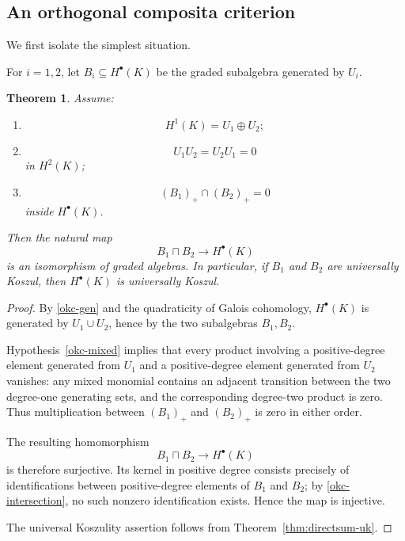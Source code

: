 \documentclass[12pt]{amsart}
\theoremstyle{plain}
\newtheorem{theorem}{Theorem}[section]
\theoremstyle{definition}
\theoremstyle{remark}
\numberwithin{equation}{section}
\begin{document}
\subsection{An orthogonal composita criterion}

We first isolate the simplest situation.

For \(i=1,2\), let \(B_i\subseteq H^\bullet(K)\) be the graded
subalgebra generated by \(U_i\).

\begin{theorem}
\label{thm:orthogonal-composita}
Assume:
\begin{enumerate}[label=\textnormal{(\roman*)}]
\item\label{okc-gen}
\[
H^1(K)=U_1\oplus U_2;
\]

\item\label{okc-mixed}
\[
U_1U_2=U_2U_1=0
\]
in \(H^2(K)\);

\item\label{okc-intersection}
\[
(B_1)_+\cap(B_2)_+=0
\]
inside \(H^\bullet(K)\).
\end{enumerate}
Then the natural map
\[
B_1\sqcap B_2
\longrightarrow
H^\bullet(K)
\]
is an isomorphism of graded algebras. In particular, if \(B_1\) and
\(B_2\) are universally Koszul, then \(H^\bullet(K)\) is universally
Koszul.
\end{theorem}

\begin{proof}
By \ref{okc-gen} and the quadraticity of Galois cohomology,
\(H^\bullet(K)\) is generated by \(U_1\cup U_2\), hence by the two
subalgebras \(B_1,B_2\).

Hypothesis~\ref{okc-mixed} implies that every product involving a
positive-degree element generated from \(U_1\) and a positive-degree
element generated from \(U_2\) vanishes: any mixed monomial contains
an adjacent transition between the two degree-one generating sets,
and the corresponding degree-two product is zero. Thus multiplication
between \((B_1)_+\) and \((B_2)_+\) is zero in either order.

The resulting homomorphism
\[
B_1\sqcap B_2\to H^\bullet(K)
\]
is therefore surjective. Its kernel in positive degree consists
precisely of identifications between positive-degree elements of
\(B_1\) and \(B_2\); by \ref{okc-intersection}, no such nonzero
identification exists. Hence the map is injective.

The universal Koszulity assertion follows from
Theorem~\ref{thm:directsum-uk}.
\end{proof}
\end{document}
